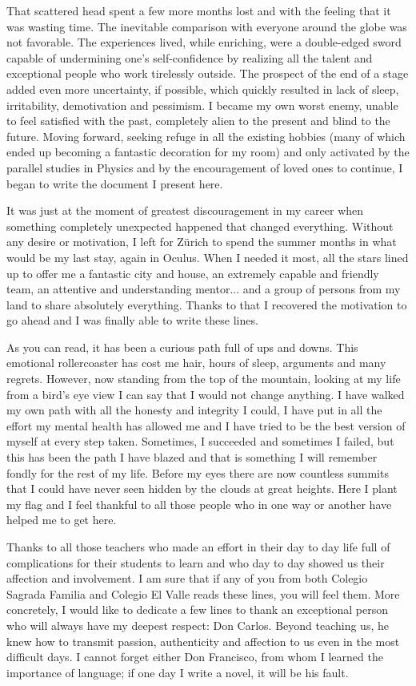 That scattered head spent a few more months lost and with the feeling that it was wasting time. The inevitable comparison with everyone around the globe was not favorable. The experiences lived, while enriching, were a double-edged sword capable of undermining one's self-confidence by realizing all the talent and exceptional people who work tirelessly outside. The prospect of the end of a stage added even more uncertainty, if possible, which quickly resulted in lack of sleep, irritability, demotivation and pessimism. I became my own worst enemy, unable to feel satisfied with the past, completely alien to the present and blind to the future. Moving forward, seeking refuge in all the existing hobbies (many of which ended up becoming a fantastic decoration for my room) and only activated by the parallel studies in Physics and by the encouragement of loved ones to continue, I began to write the document I present here.

It was just at the moment of greatest discouragement in my career when something completely unexpected happened that changed everything. Without any desire or motivation, I left for Zürich to spend the summer months in what would be my last stay, again in Oculus. When I needed it most, all the stars lined up to offer me a fantastic city and house, an extremely capable and friendly team, an attentive and understanding mentor... and a group of persons from my land to share absolutely everything. Thanks to that I recovered the motivation to go ahead and I was finally able to write these lines.

As you can read, it has been a curious path full of ups and downs. This emotional rollercoaster has cost me hair, hours of sleep, arguments and many regrets. However, now standing from the top of the mountain, looking at my life from a bird's eye view I can say that I would not change anything. I have walked my own path with all the honesty and integrity I could, I have put in all the effort my mental health has allowed me and I have tried to be the best version of myself at every step taken. Sometimes, I succeeded and sometimes  I failed, but this has been the path I have blazed and that is something I will remember fondly for the rest of my life. Before my eyes there are now countless summits that I could have never seen hidden by the clouds at great heights. Here I plant my flag and I feel thankful to all those people who in one way or another have helped me to get here.

Thanks to all those teachers who made an effort in their day to day life full of complications for their students to learn and who day to day showed us their affection and involvement. I am sure that if any of you from both Colegio Sagrada Familia and Colegio El Valle reads these lines, you will feel them. More concretely, I would like to dedicate a few lines to thank an exceptional person who will always have my deepest respect: Don Carlos. Beyond teaching us, he knew how to transmit passion, authenticity and affection to us even in the most difficult days. I cannot forget either Don Francisco, from whom I learned the importance of language; if one day I write a novel, it will be his fault.

